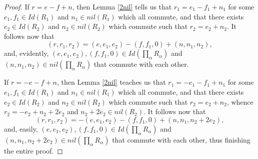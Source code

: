 \documentclass[10pt,a4paper]{amsart}
\begin{document}
\begin{proof}
\medskip

 If $r=e-f+n$, then Lemma \ref{2nil} tells us that $r_1=e_1-f_1+n_1$ for some $e_1,f_1\in Id(R_1)$ and $n_1\in nil(R_1)$ which all commute, and that there exists $e_2\in Id(R_2)$ and $n_2\in nil(R_2)$ which commute such that $r_2=e_2+n_2$. It follows now that $$(r,r_1,r_2)=(e,e_1,e_2)-(f,f_1,0)+(n,n_1,n_2),$$ and, evidently, $(e,e_1,e_2),(f,f_1,0)\in Id(\prod_{\alpha} R_{\alpha})$ and $(n,n_1,n_2)\in nil(\prod_{\alpha} R_{\alpha})$ that commute with each other.

\medskip

 If $r=-e-f+n$, then Lemma \ref{2nil} teaches us that $r_1=-e_1-f_1+n_1$ for some $e_1,f_1\in Id(R_1)$ and $n_1\in nil(R_1)$ which all commute, and that there exists $e_2\in Id(R_2)$ and $n_2\in nil(R_2)$ which commute such that $r_2=e_2+n_2$, whence $r_2=-e_2+n_2+2e_2$ and $n_2+2e_2\in nil(R_2)$. It follows now that $$(r,r_1,r_2)=-(e,e_1,e_2)-(f,f_1,0)+(n,n_1,n_2+2e_2),$$ and, easily, $(e,e_1,e_2),(f,f_1,0)\in Id(\prod_{\alpha} R_{\alpha})$ and $(n,n_1,n_2+2e_2)\in nil(\prod_{\alpha} R_{\alpha})$ that commute with each other, thus finishing the entire proof.
\end{proof}
\end{document}
